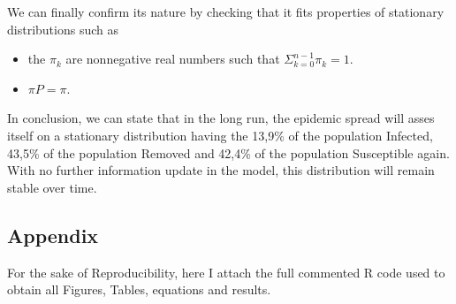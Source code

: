 \documentclass[10pt]{article}
\theoremstyle{plain}
\theoremstyle{definition}
\begin{document}
We can finally confirm its nature by checking that it fits properties of stationary distributions such as
\begin{itemize}
    \item the $\pi_k$ are nonnegative real numbers such that $\Sigma_{k=0}^{n-1}\pi_k = 1$.
    \item $\pi \textit{P} = \pi$.
\end{itemize}

In conclusion, we can state that in the long run, the epidemic spread will asses itself on a stationary distribution having the 13,9\% of the population Infected, 43,5\% of the population Removed and 42,4\% of the population Susceptible again. With no further information update in the model, this distribution will remain stable over time.
\newpage
\subsection{Appendix}
For the sake of Reproducibility, here I attach the full commented R code used to obtain all Figures, Tables, equations and results.

\end{document}
